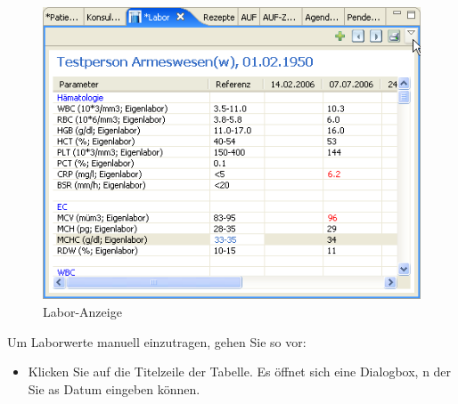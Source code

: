 \begin{figure}[htp]
\begin{center}
  \includegraphics{images/labview}
  \caption{Labor-Anzeige}
  \label{fig:labview}
\end{center}
\end{figure}

Um Laborwerte manuell einzutragen, gehen Sie so vor:
\begin{itemize}
  \item Klicken Sie auf die Titelzeile der Tabelle. Es öffnet sich eine
  Dialogbox, n der Sie as Datum eingeben können.
\end{itemize}